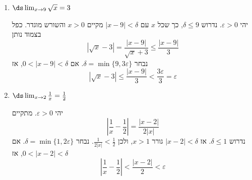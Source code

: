 \begin{enumerate}
\begin{solbox}
נדרוש למשל כי
$0<\delta<\frac{1}{2}$
כי אז
$|x+1|<\tfrac{1}{2}$
יגרור
$-\tfrac{3}{2}<x<-\tfrac{1}{2}$,
ולכן
$$.1=2\cdot\left(-\tfrac{3}{2}\right)+4<2x+4<2\cdot\left(-\tfrac{1}{2}\right)+4<3$$

עד כה בחרנו
$\delta<\frac{1}{2}$
ולכן
לכל
$x$
עבורו
$|x+1|<\delta$
מתקיים
$$|f(x)-1|=\left|\frac{x+1}{2x+4}\right|<
\frac{\delta}{|2x+4|}\le \frac{\delta}{1}=\delta$$
כי ראינו שבהכרח
$|2x+4|\ge 1$.
לסיום, נדרוש כי
$\delta<\varepsilon$,
ובסך הכל נדרוש כי
\[
0<\delta<\min\left\{\frac12,\varepsilon\right\}
\]
ואם $0<|x+1|<\delta$, נקבל
\[
|f(x)-1|=\left|\frac{3x+5}{2x+4}-1\right|<\varepsilon
\]
\end{solbox}
\fi
\item $\ds\lim_{x\to9}\sqrt x=3$
\ifsol
{}
\begin{solbox}
יהי $\varepsilon>0$. נדרוש $\delta\le9$, כך שכל $x$ עם $|x-9|<\delta$ מקיים $x>0$ והשורש מוגדר. כפל בצמוד נותן
\[\left|\sqrt x-3\right|=\frac{|x-9|}{\sqrt x+3}\le\frac{|x-9|}{3}\]
נבחר $\delta=\min\{9,3\varepsilon\}$. אם $0<|x-9|<\delta$, אז
\[\left|\sqrt x-3\right|\le\frac{|x-9|}{3}<\frac{3\varepsilon}{3}=\varepsilon\]
\end{solbox}
\fi

\item $\ds\lim_{x\to2}\frac1x=\frac12$
\ifsol
{}
\begin{solbox}
יהי $\varepsilon>0$. מתקיים
\[\left|\frac1x-\frac12\right|=\frac{|x-2|}{2|x|}\]
נדרוש $\delta\le1$. אז $|x-2|<\delta$ גורר $x>1$, ולכן $\frac{1}{2|x|}<\frac12$. נבחר $\delta=\min\{1,2\varepsilon\}$. אם $0<|x-2|<\delta$, אז
\[\left|\frac1x-\frac12\right|<\frac{|x-2|}{2}<\varepsilon\]
\end{solbox}
\fi

\eMs
\end{enumerate}
